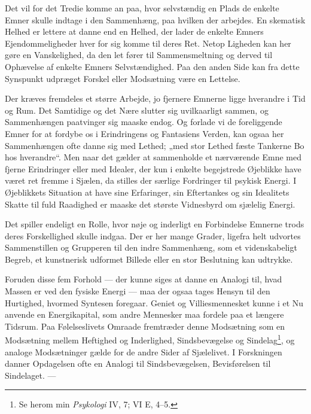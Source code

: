\documentclass[12pt,a4paper]{book}
\newcommand{\opage}[1]{\marginnote{\footnotesize\textit{[#1]}}}
\begin{document}
Det vil for det Tredie komme an paa, hvor selvstændig en Plads de
enkelte Emner skulle indtage i den Sammenhæng, paa hvilken der
arbejdes. En skematisk Helhed er lettere at danne end en Helhed, der
lader de enkelte Emners Ejendommeligheder hver for sig komme til deres
Ret. Netop Ligheden kan her gøre en Vanskelighed, da den let fører til
Sammensmeltning og derved til Ophævelse af enkelte Emners
Selvstændighed. Paa den anden Side kan fra dette Synspunkt udpræget
Forskel eller Modsætning være en Lettelse.

Der kræves fremdeles et større Arbejde, jo fjernere Emnerne ligge
hverandre i Tid og Rum. Det Samtidige og det Nære slutter sig
uvilkaarligt sammen, og Sammenhængen paatvinger sig maaske endog. Og
forlade vi de foreliggende Emner for at fordybe os i Erindringens og
Fantasiens Verden, kan ogsaa her Sammenhængen ofte danne sig med
Lethed; „med stor Lethed fæste Tankerne Bo hos hverandre“. Men naar det gælder at sammenholde et nærværende Emne med fjerne Erindringer
eller med Idealer, der kun i enkelte begejstrede Øjeblikke have været
ret fremme i Sjælen, da stilles der særlige Fordringer til psykisk
Energi. I Øjeblikkets Situation at have sine Erfaringer, sin
Eftertankes og sin Idealitets Skatte til fuld Raadighed er maaske det
største Vidnesbyrd om sjælelig Energi.

Det spiller endeligt en Rolle, hvor nøje og inderligt en Forbindelse
Emnerne trods deres Forskellighed skulle indgaa. Der er her mange
Grader, ligefra helt udvortes Sammenstillen og Grupperen til den indre
Sammenhæng, som et videnskabeligt Begreb, et kunstnerisk udformet
Billede eller en stor Beslutning kan udtrykke.

Foruden disse fem Forhold --- der kunne siges at danne en Analogi til, hvad Massen er ved den fysiske Energi --- maa der ogsaa tages Hensyn
til den Hurtighed, hvormed Syntesen foregaar. Geniet og
Villiesmennesket kunne i et Nu anvende en Energikapital, som andre
Mennesker maa
\opage{6}fordele paa et længere Tidsrum. Paa Følelseslivets
Omraade fremtræder denne Modsætning som en Modsætning mellem Heftighed
og Inderlighed, Sindsbevægelse og Sindelag\footnote{Se herom min
\emph{Psykologi} IV, 7; VI E, 4--5.}, og analoge Modsætninger gælde
for de andre Sider af Sjælelivet. I Forskningen danner Opdagelsen ofte
en Analogi til Sindsbevægelsen, Bevisførelsen til Sindelaget. ---
\end{document}

